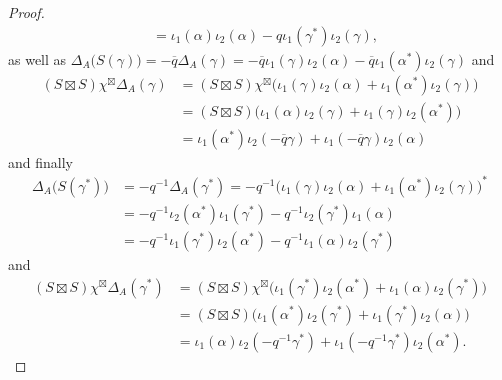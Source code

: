 \documentclass[10pt,a4paper]{amsart}
\begin{document}
\begin{proof}
\begin{align*}
&=\iota_1(\alpha)\iota_2(\alpha)-q\iota_1(\gamma^*)\iota_2(\gamma),
\end{align*}
as well as $\Delta_A\bigl(S(\gamma)\bigr)
=-\overline{q}\Delta_A(\gamma)=-\overline{q}\iota_1(\gamma)\iota_2(\alpha)
-\overline{q}\iota_1(\alpha^*)\iota_2(\gamma)$ and
\begin{align*}
(S\boxtimes S)\chi^{\boxtimes}\Delta_A(\gamma)
&=(S\boxtimes S)\chi^{\boxtimes}\bigl(\iota_1(\gamma)\iota_2(\alpha)+\iota_1(\alpha^*)\iota_2(\gamma)\bigr)\\
&=(S\boxtimes S)\bigl(\iota_1(\alpha)\iota_2(\gamma)+\iota_1(\gamma)\iota_2(\alpha^*)\bigr)\\
&=\iota_1(\alpha^*)\iota_2(-\overline{q}\gamma)+\iota_1(-\overline{q}\gamma)\iota_2(\alpha)
\end{align*}
and finally
\begin{align*}
\Delta_A\bigl(S(\gamma^*)\bigr)
&=-q^{-1}\Delta_A(\gamma^*)
=-q^{-1}\bigl(\iota_1(\gamma)\iota_2(\alpha)+\iota_1(\alpha^*)\iota_2(\gamma)\bigr)^*\\
&=-q^{-1}\iota_2(\alpha^*)\iota_1(\gamma^*)-q^{-1}\iota_2(\gamma^*)\iota_1(\alpha)\\
&=-q^{-1}\iota_1(\gamma^*)\iota_2(\alpha^*)-q^{-1} \iota_1(\alpha)\iota_2(\gamma^*)
\end{align*}
and
\begin{align*}
(S\boxtimes S)\chi^{\boxtimes}\Delta_A(\gamma^*)
&=(S\boxtimes S)\chi^{\boxtimes}\bigl(\iota_1(\gamma^*)\iota_2(\alpha^*)+\iota_1(\alpha)\iota_2(\gamma^*)\bigr)\\
&=(S\boxtimes S)\bigl(\iota_1(\alpha^*)\iota_2(\gamma^*)+\iota_1(\gamma^*)\iota_2(\alpha)\bigr)\\
&=\iota_1(\alpha)\iota_2(-q^{-1}\gamma^*)+\iota_1(-q^{-1}\gamma^*)\iota_2(\alpha^*).
\end{align*}


\end{proof}
\end{document}
